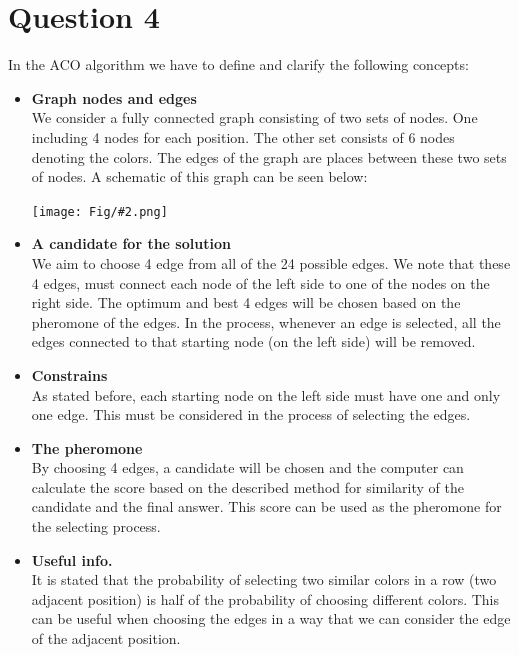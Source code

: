 \documentclass[]{article}
\newcommand{\pict}[2]{\begin{center}
		\texttt{[image: Fig/\#2.png]}
\end{center}}
\begin{document}
	\section{Question 4}
	In the ACO algorithm we have to define and clarify the following concepts:
	\begin{itemize}
		\item \textbf{Graph nodes and edges}\\
		We consider a fully connected graph consisting of two sets of nodes. One including 4 nodes for each position. The other set consists of 6 nodes denoting the colors. The edges of the graph are places between these two sets of nodes. A schematic of this graph can be seen below:
		\pict{0.3}{F2}
		
		\item \textbf{A candidate for the solution} \\
		We aim to choose 4 edge from all of the 24 possible edges. We note that these 4 edges, must connect each node of the left side to one of the nodes on the right side. The optimum and best 4 edges will be chosen based on the pheromone of the edges. In the process, whenever an edge is selected, all the edges connected to that starting node (on the left side) will be removed.
		
		\item \textbf{Constrains} \\
		As stated before, each starting node on the left side must have one and only one edge. This must be considered in the process of selecting the edges.
		
		\item \textbf{The pheromone} \\
		By choosing 4 edges, a candidate will be chosen and the computer can calculate the score based on the described method for similarity of the candidate and the final answer. This score can be used as the pheromone for the selecting process.
		
		\item \textbf{Useful info.} \\
		It is stated that the probability of selecting two similar colors in a row (two adjacent position) is half of the probability of choosing different colors. This can be useful when choosing the edges in a way that we can consider the edge of the adjacent position.
	\end{itemize}

\end{document}
